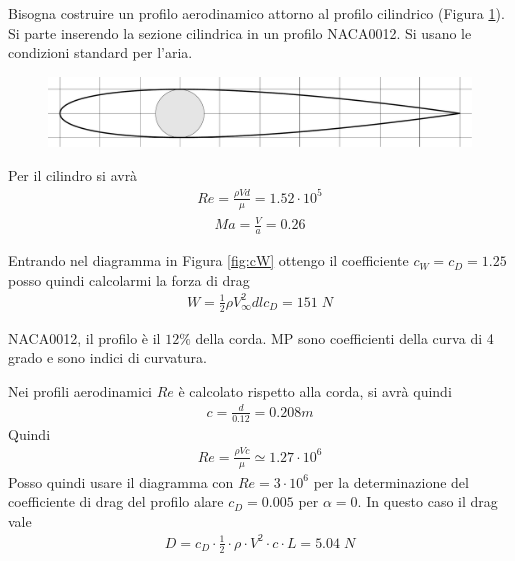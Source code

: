 \documentclass[fleqn]{article}
\begin{document}
Bisogna costruire un profilo aerodinamico attorno al profilo cilindrico (Figura \ref{fig:NACA0012}).
Si parte inserendo la sezione cilindrica in un profilo NACA0012. 
Si usano le condizioni standard per l'aria.
\begin{figure}[h!]
\centering
  \includegraphics[width=.7\textwidth]{fig/NACA0012.pdf}
\caption{}
\label{fig:NACA0012}
\end{figure} 

Per il cilindro si avrà
\begin{align*}
Re = \frac{\rho V d}{\mu} = 1.52 \cdot 10^5
\end{align*}
\begin{align*}
Ma = \frac{V}{a} = 0.26
\end{align*}

Entrando nel diagramma in Figura \ref{fig:cW} ottengo il coefficiente $c_W = c_D = 1.25$ posso quindi calcolarmi la forza di drag
\begin{align*}
W = \frac{1}{2} \rho V_{\infty}^2 dl c_D = 151 \; N
\end{align*}

NACA0012, il profilo è il $12\%$ della corda. MP sono coefficienti della curva di 4 grado e sono indici di curvatura.

Nei profili aerodinamici $Re$ è calcolato rispetto alla corda, si avrà quindi 
\begin{align*}
c = \frac{d}{0.12} = 0.208 m 
\end{align*}
Quindi
\begin{align*}
Re =  \frac{\rho V c}{\mu} \simeq 1.27 \cdot 10^6
\end{align*}
Posso quindi usare il diagramma con $Re = 3 \cdot 10^6$ per la determinazione del coefficiente di drag del profilo alare $c_D = 0.005$ per $\alpha = 0$.
In questo caso il drag vale 
\begin{align*}
D = c_D \cdot \frac{1}{2} \cdot \rho \cdot V^2 \cdot c \cdot L  = 5.04 \; N
\end{align*}
\end{document}
